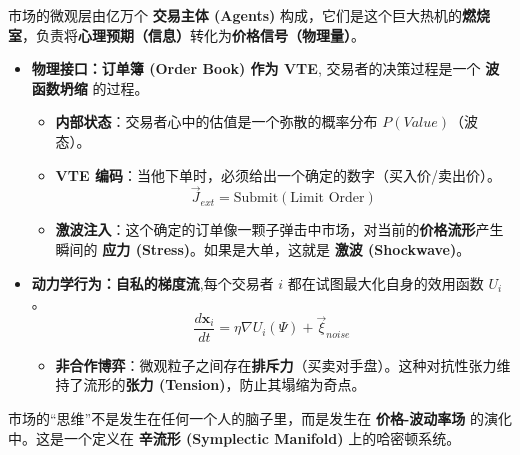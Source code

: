 市场的微观层由亿万个 \textbf{交易主体 (Agents)} 构成，它们是这个巨大热机的\textbf{燃烧室}，负责将\textbf{心理预期（信息）}转化为\textbf{价格信号（物理量）}。
\begin{itemize}
    \item \textbf{\textcolor{structurecolor}{物理接口：订单簿 (Order Book) 作为 VTE}}, 交易者的决策过程是一个 \textbf{波函数坍缩} 的过程。
    \begin{itemize}
        \item   \textbf{内部状态}：交易者心中的估值是一个弥散的概率分布 $P(Value)$（波态）。
        \item   \textbf{VTE 编码}：当他下单时，必须给出一个确定的数字（买入价/卖出价）。
            $$ \vec{J}_{ext} = \text{Submit}(\text{Limit Order}) $$
        \item   \textbf{激波注入}：这个确定的订单像一颗子弹击中市场，对当前的\textbf{价格流形}产生瞬间的 \textbf{应力 (Stress)}。如果是大单，这就是 \textbf{激波 (Shockwave)}。
    \end{itemize}

    \item \textbf{\textcolor{structurecolor}{动力学行为：自私的梯度流}},每个交易者 $i$ 都在试图最大化自身的效用函数 $U_i$。
     $$ \frac{d\mathbf{x}_i}{dt} = \eta \nabla U_i(\Psi) + \vec{\xi}_{noise} $$
    \begin{itemize}
        \item   \textbf{非合作博弈}：微观粒子之间存在\textbf{排斥力}（买卖对手盘）。这种对抗性张力维持了流形的\textbf{张力 (Tension)}，防止其塌缩为奇点。
    \end{itemize}
\end{itemize}



市场的“思维”不是发生在任何一个人的脑子里，而是发生在 \textbf{价格-波动率场} 的演化中。这是一个定义在 \textbf{辛流形 (Symplectic Manifold)} 上的哈密顿系统。


